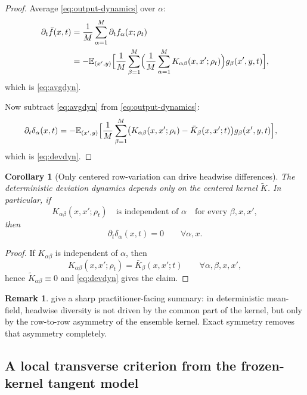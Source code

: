 \documentclass[11pt]{article}
\newtheorem{corollary}[theorem]{Corollary}
\theoremstyle{definition}
\newtheorem{remark}[theorem]{Remark}
\newcommand{\E}{\mathbb{E}}
\begin{document}
\begin{proof}
Average \cref{eq:output-dynamics} over $\alpha$:
\begin{align*}
  \partial_t \bar f(x,t)
  &=
  \frac1M \sum_{\alpha=1}^M \partial_t f_\alpha(x;\rho_t)
  \\
  &=
  -
  \E_{(x',y)}
  \Bigl[
    \frac1M \sum_{\beta=1}^M
    \Bigl(
      \frac1M \sum_{\alpha=1}^M K_{\alpha\beta}(x,x';\rho_t)
    \Bigr)
    g_\beta(x',y,t)
  \Bigr],
\end{align*}
which is \eqref{eq:avgdyn}.

Now subtract \eqref{eq:avgdyn} from \cref{eq:output-dynamics}:
\begin{align*}
  \partial_t \delta_\alpha(x,t)
  &=
  -
  \E_{(x',y)}
  \Bigl[
    \frac1M \sum_{\beta=1}^M
    \bigl(
      K_{\alpha\beta}(x,x';\rho_t)-\bar K_\beta(x,x';t)
    \bigr)
    g_\beta(x',y,t)
  \Bigr],
\end{align*}
which is \eqref{eq:devdyn}.
\end{proof}

\begin{corollary}[Only centered row-variation can drive headwise differences]
\label{cor:rowvariation}
The deterministic deviation dynamics depends only on the centered kernel $\widetilde K$.
In particular, if
\[
  K_{\alpha\beta}(x,x';\rho_t)
  \quad
  \text{is independent of }\alpha
  \quad
  \text{for every }\beta,x,x',
\]
then
\[
  \partial_t \delta_\alpha(x,t)=0
  \qquad
  \forall \alpha,x.
\]
\end{corollary}

\begin{proof}
If $K_{\alpha\beta}$ is independent of $\alpha$, then
\[
  K_{\alpha\beta}(x,x';\rho_t)=\bar K_\beta(x,x';t)
  \qquad \forall \alpha,\beta,x,x',
\]
hence $\widetilde K_{\alpha\beta}\equiv 0$ and \eqref{eq:devdyn} gives the claim.
\end{proof}

\begin{remark}
 give a sharp practitioner-facing summary:
in deterministic mean-field, headwise diversity is not driven by the common part of the kernel,
but only by the row-to-row asymmetry of the ensemble kernel.
Exact symmetry removes that asymmetry completely.
\end{remark}

\subsection{A local transverse criterion from the frozen-kernel tangent model}
\end{document}
